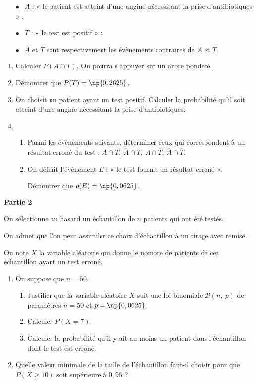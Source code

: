 \documentclass[11pt]{article}
\begin{document}
\begin{itemize}
\item[$\bullet~~$]$A$ : « le patient est atteint d'une angine nécessitant la prise d'antibiotiques »{} ; 
\item[$\bullet~~$]$T$ : « le test est positif »{} ;
\item[$\bullet~~$]$\overline{A}$ et $\overline{T}$ sont respectivement les évènements contraires de $A$ et $T$.
\end{itemize}

\medskip

\begin{enumerate}
\item Calculer $P(A \cap T)$. On pourra s'appuyer sur un arbre pondéré.
\item Démontrer que $P(T) = \np{0,2625}$.
\item On choisit un patient ayant un test positif. Calculer la probabilité qu'il soit atteint d'une angine nécessitant la prise d'antibiotiques.
\item
	\begin{enumerate}
		\item Parmi les évènements suivants, déterminer ceux qui correspondent à un résultat erroné du test :  $A \cap T,\: \overline{A} \cap T,\:A \cap \overline{T},\: \overline{A} \cap \overline{T}$.
		\item On définit l'évènement $E$ : « le test fournit un résultat erroné ». 
		
Démontrer que $p(E) = \np{0,0625}$.
	\end{enumerate}
\end{enumerate}

\bigskip

\textbf{Partie 2}

\medskip

On sélectionne au hasard un échantillon de $n$ patients qui ont été testés.

On admet que l'on peut assimiler ce choix d'échantillon à un tirage avec remise.

On note $X$ la variable aléatoire qui donne le nombre de patients de cet échantillon ayant un test erroné.

\medskip

\begin{enumerate}
\item On suppose que $n = 50$.
	\begin{enumerate}
		\item Justifier que la variable aléatoire $X$ suit une loi binomiale $\mathcal{B}(n,\: p)$ de paramètres
$n = 50$ et $p = \np{0,0625}.$
		\item Calculer $P(X = 7)$.
		\item Calculer la probabilité qu'il y ait au moins un patient dans l'échantillon dont le test est erroné.
	\end{enumerate}	
\item Quelle valeur minimale de la taille de l'échantillon faut-il choisir pour que $P(X \geqslant 10)$ soit supérieure à $0,95$ ?
\end{enumerate}
\end{document}
